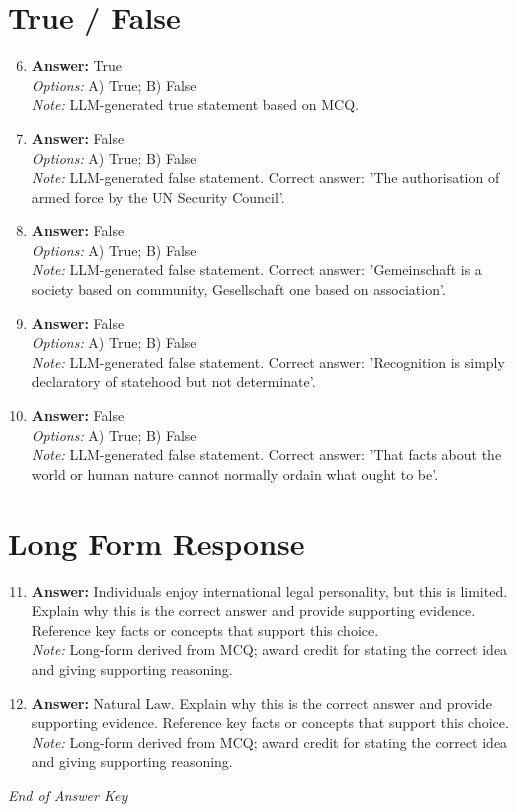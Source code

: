 \documentclass[12pt]{article}
\begin{document}
\section*{True / False}
\begin{enumerate}[label=\arabic*.]
\setcounter{enumi}{5}
\item \textbf{Answer:} True
\\ \textit{Options:} A) True; B) False
\\ \textit{Note:} LLM-generated true statement based on MCQ.
\item \textbf{Answer:} False
\\ \textit{Options:} A) True; B) False
\\ \textit{Note:} LLM-generated false statement. Correct answer: 'The authorisation of armed force by the UN Security Council'.
\item \textbf{Answer:} False
\\ \textit{Options:} A) True; B) False
\\ \textit{Note:} LLM-generated false statement. Correct answer: 'Gemeinschaft is a society based on community, Gesellschaft one based on association'.
\item \textbf{Answer:} False
\\ \textit{Options:} A) True; B) False
\\ \textit{Note:} LLM-generated false statement. Correct answer: 'Recognition is simply declaratory of statehood but not determinate'.
\item \textbf{Answer:} False
\\ \textit{Options:} A) True; B) False
\\ \textit{Note:} LLM-generated false statement. Correct answer: 'That facts about the world or human nature cannot normally ordain what ought to be'.
\end{enumerate}

\section*{Long Form Response}
\begin{enumerate}[label=\arabic*.]
\setcounter{enumi}{10}
\item \textbf{Answer:} Individuals enjoy international legal personality, but this is limited. Explain why this is the correct answer and provide supporting evidence. Reference key facts or concepts that support this choice.
\\ \textit{Note:} Long-form derived from MCQ; award credit for stating the correct idea and giving supporting reasoning.
\item \textbf{Answer:} Natural Law. Explain why this is the correct answer and provide supporting evidence. Reference key facts or concepts that support this choice.
\\ \textit{Note:} Long-form derived from MCQ; award credit for stating the correct idea and giving supporting reasoning.
\end{enumerate}

\vfill
\noindent\textit{End of Answer Key}
\end{document}
